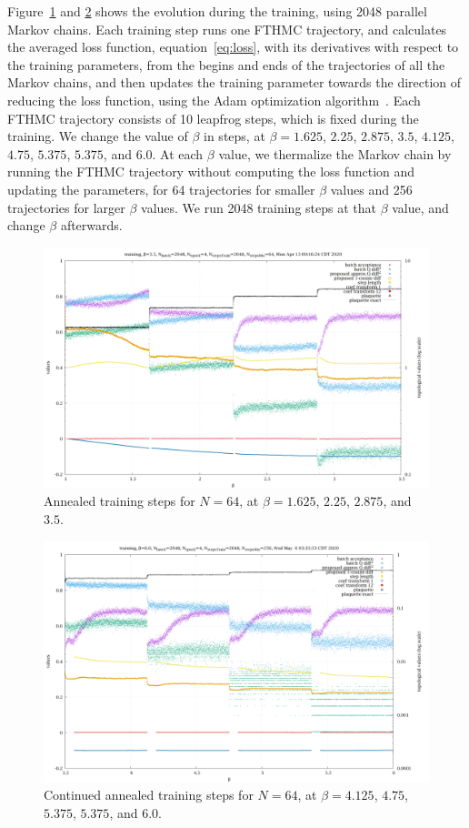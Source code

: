 Figure~\ref{training} and \ref{training-b6} shows the evolution during the training,
using 2048 parallel Markov chains.
Each training step runs one FTHMC trajectory, and calculates the averaged loss function,
equation~\eqref{eq:loss}, with its derivatives with respect to the training parameters,
from the begins and ends of the trajectories of all the Markov chains,
and then updates the training parameter towards the direction of reducing the loss function,
using the Adam optimization algorithm~\cite{DBLP:journals/corr/KingmaB14}.
Each FTHMC trajectory consists of 10 leapfrog steps, which is fixed during the training.
We change the value of $β$ in steps,
at $β=1.625$, $2.25$, $2.875$, $3.5$, $4.125$, $4.75$, $5.375$, $5.375$, and $6.0$.
At each $β$ value, we thermalize the Markov chain by running the FTHMC trajectory without
computing the loss function and updating the parameters,
for 64 trajectories for smaller $β$ values and 256 trajectories for larger $β$ values.
We run 2048 training steps at that $β$ value, and change $β$ afterwards.

\begin{figure}
	\centering
	\includegraphics[width=\textwidth]{../t13.png}
	\caption{\label{training}Annealed training steps for $N=64$,
		at $β=1.625$, $2.25$, $2.875$, and $3.5$.}
\end{figure}

\begin{figure}
	\centering
	\includegraphics[width=\textwidth]{../t28.png}
	\caption{\label{training-b6}Continued annealed training steps for $N=64$,
		at $β=4.125$, $4.75$, $5.375$, $5.375$, and $6.0$.}
\end{figure}


